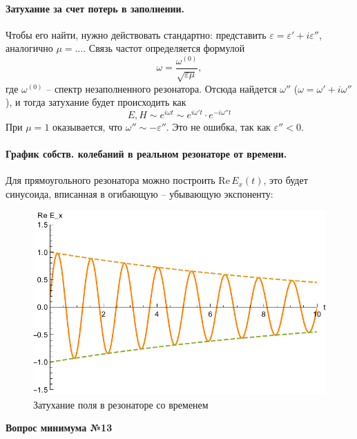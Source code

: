 \documentclass[a4paper,14pt]{extarticle}
\newcommand{\ticket}[1] {
\newpage
\hypertarget{num#1}{}
\begin{center}
	\textbf{Вопрос минимума №#1 }
\end{center}
}
\begin{document}
\paragraph{Затухание за счет потерь в заполнении.} Чтобы его найти, нужно действовать стандартно: представить 
$\varepsilon=\varepsilon'+i \varepsilon''$, аналогично $\mu=\ldots$. Связь частот определяется формулой
\begin{equation}
	\omega=\frac{\omega^{(0)}}{\sqrt{\varepsilon \mu}},
\end{equation}
где $\omega^{(0)}$ -- спектр незаполненного резонатора. Отсюда найдется $\omega''$ ($\omega=\omega'+i \omega''$), и тогда затухание будет происходить как 
\begin{equation}
	E,H  \sim e^{i \omega t} \sim e^{i \omega' t}\cdot e^{-i \omega'' t}
\end{equation}
При $\mu=1$ оказывается, что $\omega''\sim -\varepsilon''$. Это не ошибка, так как $\varepsilon''<0$. %
\paragraph{График собств. колебаний в реальном резонаторе от времени.} Для прямоугольного резонатора можно построить $\mathrm{Re}\, E_x(t)$, это будет синусоида, вписанная в огибающую -- убывающую экспоненту:
\begin{figure}[H]
	\centering
	\includegraphics[scale=1]{img2/exp.pdf}
	\caption{Затухание поля в резонаторе со временем}
	\label{fig:figure1}
\end{figure}




\ticket{13}
\end{document}
